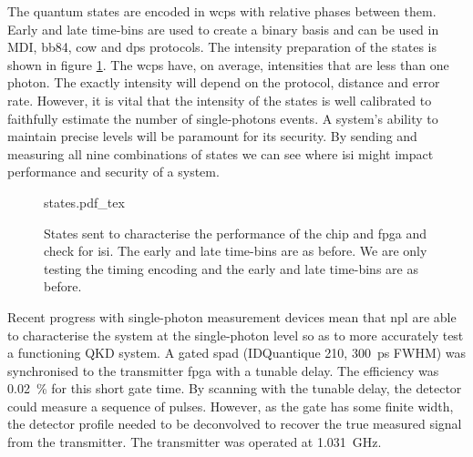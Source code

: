 The quantum states are encoded in \acp{wcp} with relative phases between them. Early and late time-bins are used to create a binary basis and can be used in \ac{MDI}, \ac{bb84}, \ac{cow} and \ac{dps} protocols. The intensity preparation of the states is shown in figure \ref{fig:isi_states}. The \acp{wcp} have, on average, intensities that are less than one photon. The exactly intensity will depend on the protocol, distance and error rate. However, it is vital that the intensity of the states is well calibrated to faithfully estimate the number of single-photons events. A system's ability to maintain precise levels will be paramount for its security. By sending and measuring all nine combinations of states we can see where \ac{isi} might impact performance and security of a system.

\begin{figure}[t]
	\centering
	\def\svgwidth{0.9\textwidth} 
	{states.pdf_tex}
	\caption[States sent for ISI calibration]{States sent to characterise the performance of the chip and \ac{fpga} and check for \ac{isi}. The early and late time-bins are as before. We are only testing the timing encoding and the early and late time-bins are as before.}
	\label{fig:isi_states}
\end{figure}

Recent progress with single-photon measurement devices mean that \ac{npl} are able to characterise the system at the single-photon level so as to more accurately test a functioning \ac{QKD} system. A gated \ac{spad} (IDQuantique 210, \SI{300}{ps} \ac{FWHM}) was synchronised to the transmitter \ac{fpga} with a tunable delay. The efficiency was \SI{0.02}{\percent} for this short gate time. By scanning with the tunable delay, the detector could measure a sequence of pulses. However, as the gate has some finite width, the detector profile needed to be deconvolved to recover the true measured signal from the transmitter. The transmitter was operated at \SI{1.031}{GHz}. 





